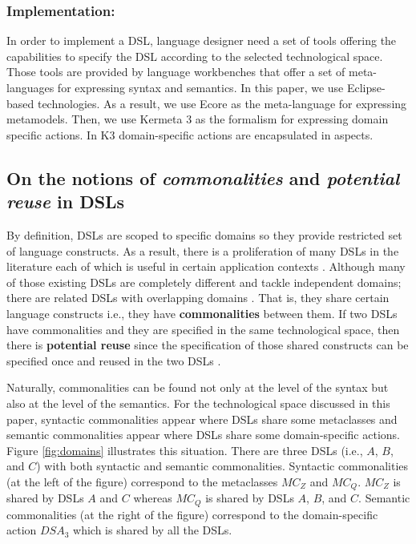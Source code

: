 \vspace{-3mm}
\subsubsection{Implementation:} In order to implement a DSL, language designer need a set of tools offering the capabilities to specify the DSL according to the selected technological space. Those tools are provided by language workbenches that offer a set of meta-languages for expressing syntax and semantics. In this paper, we use Eclipse-based technologies. As a result, we use Ecore as the meta-language for expressing metamodels. Then, we use Kermeta 3 as the formalism for expressing domain specific actions. In K3 domain-specific actions are encapsulated in aspects. 


\subsection{On the notions of \textit{commonalities} and \textit{potential reuse} in DSLs}

By definition, DSLs are scoped to specific domains so they provide restricted set of language constructs. As a result, there is a proliferation of many DSLs in the literature each of which is useful in certain application contexts \cite{Mernik:2005b}. Although many of those existing DSLs are completely different and tackle independent domains; there are related DSLs with overlapping domains \cite[p. 60-61]{voelter:2013}. That is, they share certain language constructs i.e., they have \textbf{commonalities} between them. If two DSLs have commonalities and they are specified in the same technological space, then there is \textbf{potential reuse} since the specification of those shared constructs can be specified once and reused in the two DSLs \cite[p. 60-61]{voelter:2013}.

Naturally, commonalities can be found not only at the level of the syntax but also at the level of the semantics. For the technological space discussed in this paper, syntactic commonalities appear where DSLs share some metaclasses and semantic commonalities appear where DSLs share some domain-specific actions. Figure \ref{fig:domains} illustrates this situation. There are three DSLs (i.e., $A$, $B$, and $C$) with both syntactic and semantic commonalities. Syntactic commonalities (at the left of the figure) correspond to the metaclasses $MC_Z$ and $MC_Q$. $MC_Z$ is shared by DSLs $A$ and $C$ whereas $MC_Q$ is shared by DSLs $A$, $B$, and $C$. Semantic commonalities (at the right of the figure) correspond to the domain-specific action $DSA_3$ which is shared by all the DSLs. 

